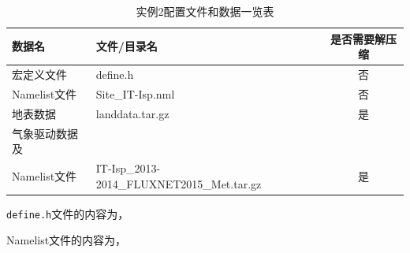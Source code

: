 \begin{table}[htbp]
\caption{实例2配置文件和数据一览表}
\centering \renewcommand{\arraystretch}{1.5}
\label{ex2table}
\begin{tabular}{llc}
\toprule
\textbf{数据名} & \textbf{文件/目录名} & \textbf{是否需要解压缩} \\

\midrule

宏定义文件 & define.h & 否 \\
Namelist文件 & Site\_IT-Isp.nml & 否 \\
地表数据 & landdata.tar.gz & 是 \\
气象驱动数据及\\Namelist文件 & IT-Isp\_2013-2014\_FLUXNET2015\_Met.tar.gz & 是 \\

\bottomrule
\end{tabular}
\end{table}

\texttt{define.h}文件的内容为，


Namelist文件的内容为，


